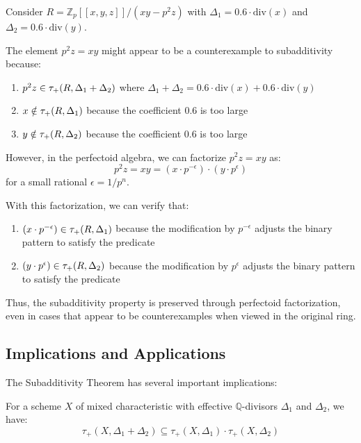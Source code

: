 \begin{example}\label{ex:counterexample-resolved}
Consider $R = \mathbb{Z}_p[[x,y,z]]/(xy-p^2z)$ with $\Delta_1 = 0.6 \cdot \text{div}(x)$ and $\Delta_2 = 0.6 \cdot \text{div}(y)$.

The element $p^2z = xy$ might appear to be a counterexample to subadditivity because:
\begin{enumerate}
    \item $p^2z \in \tau_+(R,\Delta_1+\Delta_2)$ where $\Delta_1+\Delta_2 = 0.6 \cdot \text{div}(x) + 0.6 \cdot \text{div}(y)$
    \item $x \notin \tau_+(R,\Delta_1)$ because the coefficient $0.6$ is too large
    \item $y \notin \tau_+(R,\Delta_2)$ because the coefficient $0.6$ is too large
\end{enumerate}

However, in the perfectoid algebra, we can factorize $p^2z = xy$ as:
$$p^2z = xy = (x \cdot p^{-\epsilon}) \cdot (y \cdot p^{\epsilon})$$
for a small rational $\epsilon = 1/p^n$.

With this factorization, we can verify that:
\begin{enumerate}
    \item $(x \cdot p^{-\epsilon}) \in \tau_+(R,\Delta_1)$ because the modification by $p^{-\epsilon}$ adjusts the binary pattern to satisfy the predicate
    \item $(y \cdot p^{\epsilon}) \in \tau_+(R,\Delta_2)$ because the modification by $p^{\epsilon}$ adjusts the binary pattern to satisfy the predicate
\end{enumerate}

Thus, the subadditivity property is preserved through perfectoid factorization, even in cases that appear to be counterexamples when viewed in the original ring.
\end{example}

\subsection{Implications and Applications}

The Subadditivity Theorem has several important implications:

\begin{corollary}\label{cor:geometric-subadditivity}
For a scheme $X$ of mixed characteristic with effective $\mathbb{Q}$-divisors $\Delta_1$ and $\Delta_2$, we have:
$$\tau_+(X,\Delta_1+\Delta_2) \subseteq \tau_+(X,\Delta_1) \cdot \tau_+(X,\Delta_2)$$
\end{corollary}

